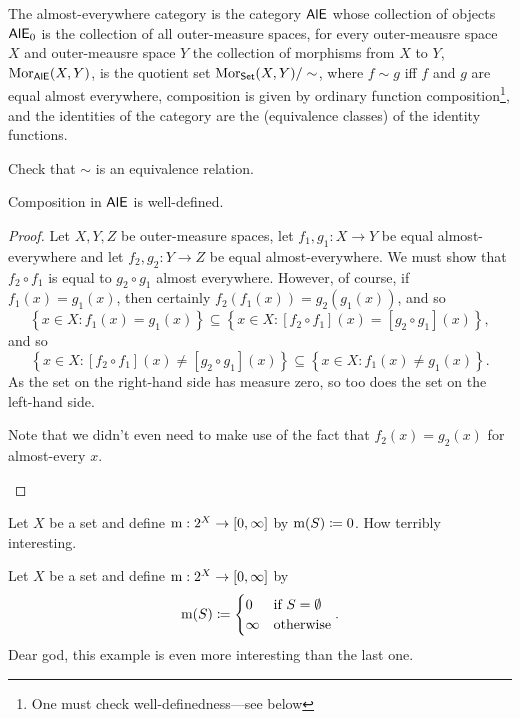 \begin{exm}
\begin{savenotes}
The almost-everywhere category is the category $\mathsf{AlE}$ whose collection of objects $\mathsf{AlE} _0$ is the collection of all outer-measure spaces, for every outer-meausre space $X$ and outer-meausre space $Y$ the collection of morphisms from $X$ to $Y$, $\operatorname{Mor} _{\mathsf{AlE}}(X,Y)$, is the quotient set $\operatorname{Mor} _{\mathsf{Set}}(X,Y)/\sim$, where $f\sim g$ iff $f$ and $g$ are equal almost everywhere, composition is given by ordinary function composition\footnote{One must check well-definedness---see below}, and the identities of the category are the (equivalence classes) of the identity functions.
\begin{exr}
Check that $\sim$ is an equivalence relation.
\end{exr}
\begin{prp}
Composition in $\mathsf{AlE}$ is well-defined.
\begin{proof}
Let $X,Y,Z$ be outer-measure spaces, let $f_1,g_1:X\rightarrow Y$ be equal almost-everywhere and let $f_2,g_2:Y\rightarrow Z$ be equal almost-everywhere.  We must show that $f_2\circ f_1$ is equal to $g_2\circ g_1$ almost everywhere.  However, of course, if $f_1(x)=g_1(x)$, then certainly $f_2(f_1(x))=g_2(g_1(x))$, and so
\begin{equation}
\left\{ x\in X:f_1(x)=g_1(x)\right\} \subseteq \left\{ x\in X:[f_2\circ f_1](x)=[g_2\circ g_1](x)\right\} ,
\end{equation}
and so
\begin{equation}
\left\{ x\in X:[f_2\circ f_1](x)\neq [g_2\circ g_1](x)\right\} \subseteq \left\{ x\in X:f_1(x)\neq g_1(x)\right\} .
\end{equation}
As the set on the right-hand side has measure zero, so too does the set on the left-hand side.
\begin{rmk}
Note that we didn't even need to make use of the fact that $f_2(x)=g_2(x)$ for almost-every $x$.
\end{rmk}
\end{proof}
\end{prp}
\end{savenotes}
\end{exm}
\begin{exm}\label{ZeroMeasure}
Let $X$ be a set and define $\mathrm{m} :2^X\rightarrow [0,\infty ]$ by $\mathrm{m} (S)\coloneqq 0$.  How terribly interesting.
\end{exm}
\begin{exm}\label{InfiniteMeasure}
Let $X$ be a set and define $\mathrm{m} :2^X\rightarrow [0,\infty ]$ by
\begin{equation}
\mathrm{m} (S)\coloneqq \begin{cases}0 & \text{if }S=\emptyset \\ \infty & \text{otherwise}\end{cases}.
\end{equation}
Dear god, this example is even more interesting than the last one.
\end{exm}
